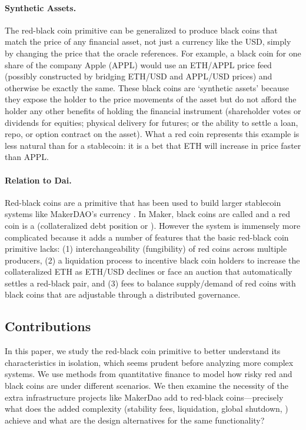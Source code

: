 \paragraph{Synthetic Assets.} The red-black coin primitive can be generalized to produce black coins that match the price of any financial asset, not just a currency like the USD, simply by changing the price that the oracle references. For example, a black coin for one share of the company Apple (APPL) would use an ETH/APPL price feed (possibly constructed by bridging ETH/USD and APPL/USD prices) and otherwise be exactly the same. These black coins are `synthetic assets' because they expose the holder to the price movements of the asset but do not afford the holder any other benefits of holding the financial instrument (\eg shareholder votes or dividends for equities; physical delivery for futures; or the ability to settle a loan, repo, or option contract on the asset). What a red coin represents this example is less natural than for a stablecoin: it is a bet that ETH will increase in price faster than APPL.

\paragraph{Relation to Dai.} Red-black coins are a primitive that has been used to build larger stablecoin systems like MakerDAO's currency \dai. In Maker, black coins are called \dai and a red coin is a \vault (\nee collateralized debt position or \cdp). However the system is immensely more complicated because it adds a number of features that the basic red-black coin primitive lacks: (1) interchangeability (fungibility) of red coins across multiple producers, (2) a liquidation process to incentive black coin holders to increase the collateralized ETH as ETH/USD declines or face an auction that automatically settles a red-black pair, and (3) fees to balance supply/demand of red coins with black coins that are adjustable through a distributed governance.

\subsection{Contributions} In this paper, we study the red-black coin primitive to better understand its characteristics in isolation, which seems prudent before analyzing more complex systems. We use methods from quantitative finance to model how risky red and black coins are under different scenarios. We then examine the necessity of the extra infrastructure projects like MakerDao add to red-black coins---precisely what does the added complexity (\eg stability fees, liquidation, global shutdown, \etc) achieve and what are the design alternatives for the same functionality?


